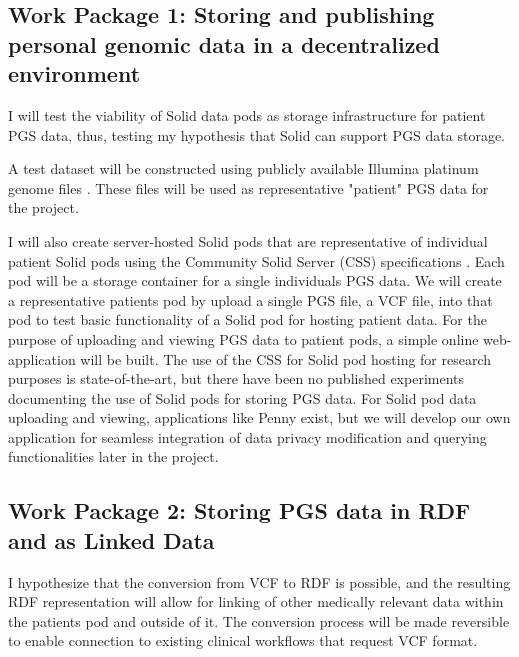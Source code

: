 \documentclass[runningheads]{llncs}
\begin{document}

\subsection{Work Package 1: Storing and publishing personal genomic data in a decentralized environment} 

I will test the viability of Solid data pods as storage infrastructure for patient PGS data, thus, testing my hypothesis that Solid can support PGS data storage. 

A test dataset will be constructed using publicly available Illumina platinum genome files \cite{noauthor_platinum_nodate}. 
These files will be used as representative "patient" PGS data for the project. 

I will also create server-hosted Solid pods that are representative of individual patient Solid pods using the Community Solid Server (CSS) specifications \cite{css}. 
Each pod will be a storage container for a single individual\textquotesingle s PGS data. 
We will create a representative patient\textquotesingle s pod by upload a single PGS file, a VCF file, into that pod to test basic functionality of a Solid pod for hosting patient data. 
For the purpose of uploading and viewing PGS data to patient pods, a simple online web-application will be built.
The use of the CSS for Solid pod hosting for research purposes is state-of-the-art, but there have been no published experiments documenting the use of Solid pods for storing PGS data. 
For Solid pod data uploading and viewing, applications like Penny \cite{penny} exist, but we will develop our own application for seamless integration of data privacy modification and querying functionalities later in the project. 


\subsection{Work Package 2:  Storing PGS data in RDF and as Linked Data}

I hypothesize that the conversion from VCF to RDF is possible, and the resulting RDF representation will allow for linking of other medically relevant data within the patient\textquotesingle s pod and outside of it.
The conversion process will be made reversible to enable connection to existing clinical workflows that request VCF format. 
\end{document}
